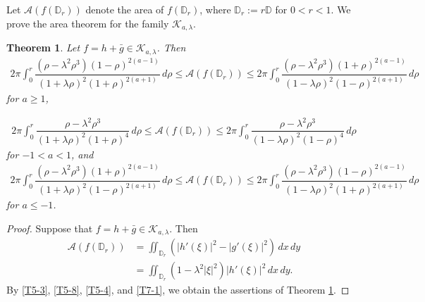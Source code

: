 \documentclass[11pt, reqno]{amsart}
\newtheorem{theorem}{Theorem}
\numberwithin{equation}{section}
\newcommand{\D}{\mbox{$\mathbb{D}$}}
\begin{document}
Let $\mathcal{A}(f(\D_r))$ denote the area of $f(\D_r)$, where $\D_r:=r\D$ for $0<r<1$.
We prove the area theorem for the family $\mathcal{K}_{a,\lambda}$.
\begin{theorem}\label{T7}
	Let $f=h+\bar{g}\in\mathcal{K}_{a,\lambda}$. Then
     \begin{equation}\label{T7-2}
    \begin{split}
     2\pi\displaystyle\int_{0}^{r}\dfrac{(\rho-\lambda^2 \rho^3)(1-\rho)^{2(a-1)}}{(1+\lambda \rho)^2(1+\rho)^{2(a+1)}}\,d\rho\leq\mathcal{A}(f(\D_r))\leq 2\pi \displaystyle\int_{0}^{r}\dfrac{(\rho-\lambda^2 \rho^3)(1+\rho)^{2(a-1)}}{(1-\lambda \rho)^2(1-\rho)^{2(a+1)}}\,d\rho
    \end{split}
    \end{equation}
     for $a\geq 1$,

 \begin{equation}\label{T7-3}
    \begin{aligned}
     2\pi \displaystyle\int_{0}^{r}\dfrac{\rho-\lambda^2 \rho^3}{(1+\lambda \rho)^2(1+\rho)^{4}}\,d\rho \leq\mathcal{A}(f(\D_r))\leq   
     2\pi \displaystyle\int_{0}^{r}\dfrac{\rho-\lambda^2 \rho^3}{(1-\lambda \rho)^2(1-\rho)^{4}}\,d\rho
    \end{aligned}
    \end{equation}
     for $-1<a<1$,
and
     \begin{equation}\label{T7-4}
    \begin{aligned}
     2\pi \displaystyle\int_{0}^{r}\dfrac{(\rho-\lambda^2 \rho^3)(1+\rho)^{2(a-1)}}{(1+\lambda \rho)^2(1-\rho)^{2(a+1)}}\,d\rho \leq\mathcal{A}(f(\D_r))\leq   
     2\pi \displaystyle\int_{0}^{r}\dfrac{(\rho-\lambda^2 \rho^3)(1-\rho)^{2(a-1)}}{(1-\lambda \rho)^2(1+\rho)^{2(a+1)}}\,d\rho
    \end{aligned}
    \end{equation}
    for $a\leq -1$.
\end{theorem}
\begin{proof}
Suppose that $f=h+\bar{g}\in\mathcal{K}_{a,\lambda}$. Then
\begin{equation}\label{T7-1}
    \begin{aligned}
        \mathcal{A}(f(\D_r))&=\displaystyle\iint_{\D_r}\left(|h'(\xi)|^2-|g'(\xi)|^2\right)\,dx\,dy\\
        &=\displaystyle\iint_{\D_r}\left(1-\lambda^2|\xi|^2\right)|h'(\xi)|^2\,dx\,dy.
    \end{aligned}
\end{equation}
By \eqref{T5-3}, \eqref{T5-8}, \eqref{T5-4}, and \eqref{T7-1}, we obtain the assertions of Theorem \ref{T7}.
\end{proof}
\end{document}
